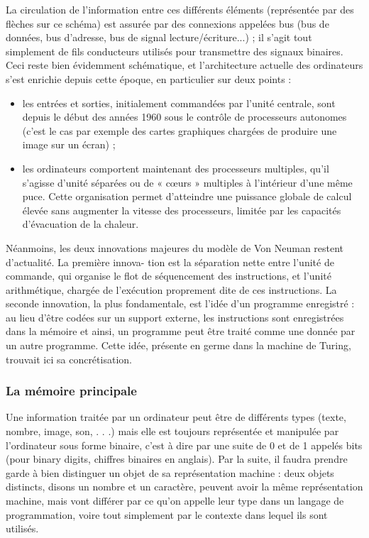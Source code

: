 La circulation de l’information entre ces différents éléments (représentée par des flèches sur ce schéma) est
assurée par des connexions appelées bus (bus de données, bus d’adresse, bus de signal lecture/écriture...) ; il
s’agit tout simplement de fils conducteurs utilisés pour transmettre des signaux binaires.
Ceci reste bien évidemment schématique, et l’architecture actuelle des ordinateurs s’est enrichie depuis cette
époque, en particulier sur deux points :
\begin{itemize}
    \item les entrées et sorties, initialement commandées par l’unité centrale, sont depuis le début des années 1960
sous le contrôle de processeurs autonomes (c’est le cas par exemple des cartes graphiques chargées de
produire une image sur un écran) ;
\item les ordinateurs comportent maintenant des processeurs multiples, qu’il s’agisse d’unité séparées ou de
« cœurs » multiples à l’intérieur d’une même puce. Cette organisation permet d’atteindre une puissance
globale de calcul élevée sans augmenter la vitesse des processeurs, limitée par les capacités d’évacuation
de la chaleur.
\end{itemize}


Néanmoins, les deux innovations majeures du modèle de Von Neuman restent d’actualité. La première innova-
tion est la séparation nette entre l’unité de commande, qui organise le flot de séquencement des instructions,
et l’unité arithmétique, chargée de l’exécution proprement dite de ces instructions. La seconde innovation,
la plus fondamentale, est l’idée d’un programme enregistré : au lieu d’être codées sur un support externe, les
instructions sont enregistrées dans la mémoire et ainsi, un programme peut être traité comme une donnée par un
autre programme. Cette idée, présente en germe dans la machine de Turing, trouvait ici sa concrétisation.

\subsubsection{La mémoire principale}
Une information traitée par un ordinateur peut être de différents types (texte, nombre, image, son, . . .) mais
elle est toujours représentée et manipulée par l’ordinateur sous forme binaire, c’est à dire par une suite de 0 et
de 1 appelés bits (pour binary digits, chiffres binaires en anglais). Par la suite, il faudra prendre garde à bien
distinguer un objet de sa représentation machine : deux objets distincts, disons un nombre et un caractère,
peuvent avoir la même représentation machine, mais vont différer par ce qu’on appelle leur type dans un
langage de programmation, voire tout simplement par le contexte dans lequel ils sont utilisés.

